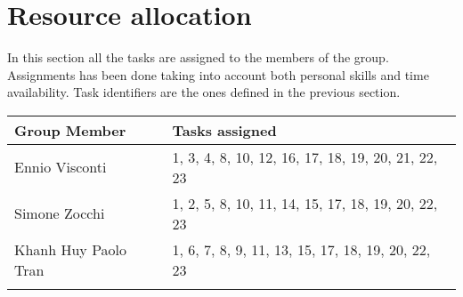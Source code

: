 \section{Resource allocation}

In this section all the tasks are assigned to the members of the group. Assignments has been done taking into account both personal skills and time availability. Task identifiers are the ones defined in the previous section.  \\

{\renewcommand{\arraystretch}{1.5}
\begin{tabularx}{\textwidth}{|X | X|}
    \hline 
    \textbf{Group Member} & \textbf{Tasks assigned}\\ 
    \hline 
    
    Ennio Visconti              &  1, 3, 4, 8, 10, 12, 16, 17, 18, 19, 20, 21, 22, 23\\ \hline
    Simone Zocchi               &  1, 2, 5, 8, 10, 11, 14, 15, 17, 18, 19, 20, 22, 23\\ \hline
    Khanh Huy Paolo Tran        &  1, 6, 7, 8, 9, 11, 13, 15, 17, 18, 19, 20, 22, 23\\ \hline
    
    
    \caption{Task assignment }\label{tab:itpd-tasks}\\
\end{tabularx}}